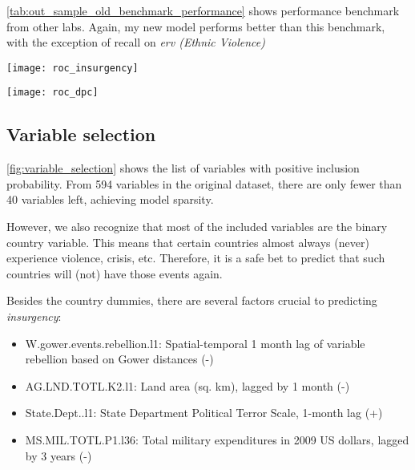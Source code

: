 \documentclass[a0,portrait]{a0poster}
\begin{document}
\begin{multicols}{2}
\autoref{tab:out_sample_old_benchmark_performance} shows performance benchmark from other labs. Again, my new model performs better than this benchmark, with the exception of recall on \textit{erv (Ethnic Violence)}
\begin{center}

\label{tab:out_sample_old_benchmark_performance}
\end{center}

\begin{center}
\texttt{[image: roc\_insurgency]}
\label{fig:roc_insurgency}
\end{center}

\begin{center}
\texttt{[image: roc\_dpc]}
\label{fig:roc_dpc}
\end{center}

\subsection*{Variable selection}

\autoref{fig:variable_selection} shows the list of variables with positive inclusion probability. From 594 variables in the original dataset, there are only fewer than 40 variables left, achieving model sparsity.

However, we also recognize that most of the included variables are the binary country variable. This means that certain countries almost always (never) experience violence, crisis, etc. Therefore, it is a safe bet to predict that such countries will (not) have those events again.

Besides the country dummies, there are several factors crucial to predicting \textit{insurgency}:
\begin{itemize}
\item W.gower.events.rebellion.l1: Spatial-temporal 1 month lag of variable rebellion based on Gower distances (-)
\item AG.LND.TOTL.K2.l1: Land area (sq. km), lagged by 1 month (-)
\item State.Dept..l1: State Department Political Terror Scale, 1-month lag (+)
\item MS.MIL.TOTL.P1.l36: Total military expenditures in 2009 US dollars, lagged by 3 years (-)
\end{itemize}


\end{multicols}
\end{document}
